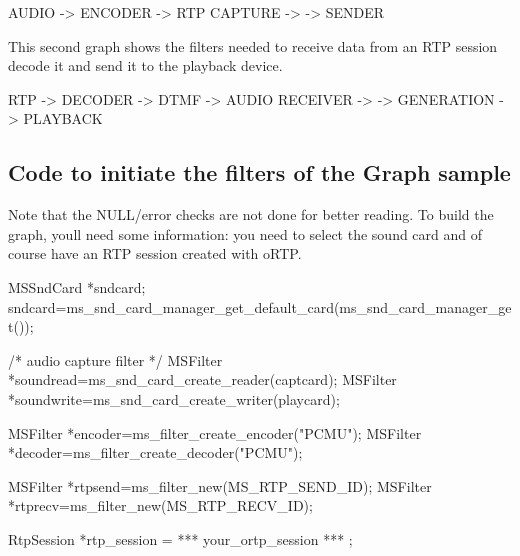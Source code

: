 \begin{DoxyPre}
             AUDIO    ->    ENCODER   ->   RTP
            CAPTURE   ->              ->  SENDER
\end{DoxyPre}


This second graph shows the filters needed to receive data from an R\+TP session decode it and send it to the playback device.


\begin{DoxyPre}
        RTP      ->    DECODER   ->   DTMF       ->   AUDIO
       RECEIVER  ->              ->  GENERATION  ->  PLAYBACK
\end{DoxyPre}


\subsection*{Code to initiate the filters of the Graph sample}

Note that the N\+U\+L\+L/error checks are not done for better reading. To build the graph, you\textquotesingle{}ll need some information\+: you need to select the sound card and of course have an R\+TP session created with o\+R\+TP.


\begin{DoxyPre}
        MSSndCard *sndcard;
        sndcard=ms\_snd\_card\_manager\_get\_default\_card(ms\_snd\_card\_manager\_get());\end{DoxyPre}



\begin{DoxyPre}        /* audio capture filter */
        MSFilter *soundread=ms\_snd\_card\_create\_reader(captcard);
        MSFilter *soundwrite=ms\_snd\_card\_create\_writer(playcard);\end{DoxyPre}



\begin{DoxyPre}        MSFilter *encoder=ms\_filter\_create\_encoder("PCMU");
        MSFilter *decoder=ms\_filter\_create\_decoder("PCMU");\end{DoxyPre}



\begin{DoxyPre}        MSFilter *rtpsend=ms\_filter\_new(MS\_RTP\_SEND\_ID);
        MSFilter *rtprecv=ms\_filter\_new(MS\_RTP\_RECV\_ID);\end{DoxyPre}



\begin{DoxyPre}        RtpSession *rtp\_session = *** your\_ortp\_session *** ;\end{DoxyPre}



